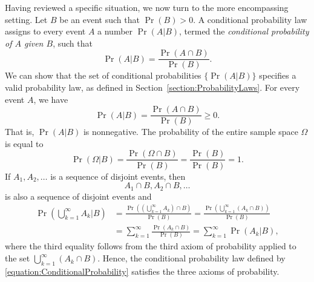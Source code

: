 Having reviewed a specific situation, we now turn to the more encompassing setting.
Let $B$ be an event such that $\Pr (B) > 0$.
A conditional probability law assigns to every event $A$ a number $\Pr (A|B)$, termed the \emph{conditional probability of $A$ given $B$}, such that 
\begin{equation} \label{equation:ConditionalProbability}
\Pr (A | B) = \frac{\Pr (A \cap B)}{\Pr (B)}.
\end{equation}
We can show that the set of conditional probabilities $\{ \Pr (A | B) \}$ specifies a valid probability law, as defined in Section~\ref{section:ProbabilityLaws}.
For every event $A$, we have
\begin{equation*}
\Pr (A|B) = \frac{\Pr (A \cap B)}{\Pr (B)} \geq 0.
\end{equation*}
That is, $\Pr (A|B)$ is nonnegative.
The probability of the entire sample space $\Omega$ is equal to
\begin{equation*}
\Pr (\Omega | B) = \frac{\Pr (\Omega \cap B)}{\Pr (B)}
= \frac{\Pr (B)}{\Pr (B)} = 1 .
\end{equation*}
If $A_1, A_2, \ldots$ is a sequence of disjoint events, then
\begin{equation*}
A_1 \cap B, A_2 \cap B, \ldots
\end{equation*}
is also a sequence of disjoint events and
\begin{equation*}
\begin{split}
\Pr \left( \bigcup_{k=1}^{\infty} A_k \Big| B \right)
&= \frac{\Pr \left( \left( \bigcup_{k=1}^{\infty} A_k \right) \cap B \right)}{\Pr (B)}
= \frac{\Pr \left( \bigcup_{k=1}^{\infty} (A_k \cap B ) \right)}{\Pr (B)} \\
&= \sum_{k = 1}^{\infty} \frac{ \Pr (A_k \cap B ) }{\Pr (B)}
= \sum_{k = 1}^{\infty} \Pr (A_k | B) ,
\end{split}
\end{equation*}
where the third equality follows from the third axiom of probability applied to the set $\bigcup_{k=1}^{\infty} (A_k \cap B )$.
Hence, the conditional probability law defined by \eqref{equation:ConditionalProbability} satisfies the three axioms of probability.

